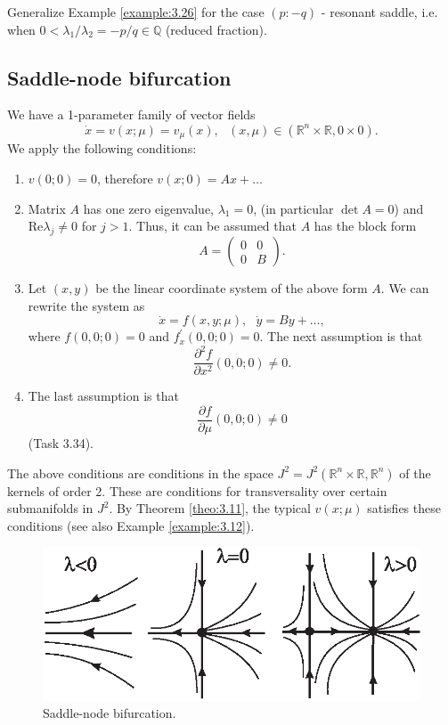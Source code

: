 \begin{task}
	Generalize Example \ref{example:3.26} for the case $\left(p:-q\right)$ - resonant saddle, i.e. when $0<\lambda _{1}/\lambda_{2} = -p/q \in \mathbb{Q}$ (reduced fraction).
\end{task}

\subsection{Saddle-node bifurcation}
We have a 1-parameter family of vector fields
$$
\dot{x}=v(x;\mu )=v_{\mu }(x),\text{ \ \ }\left( x,\mu \right) \in \left(
\mathbb{R}^{n}\times \mathbb{R},0\times 0\right) .
$$
We apply the following conditions:
\begin{enumerate}
	\item $v(0;0)=0$, therefore $v(x;0)=Ax+\ldots $
	\item Matrix $A$ has one zero eigenvalue, $\lambda _{1}=0$, (in particular $\det A = 0$) and $\textrm{Re}\lambda_{j}\not=0$ for $j>1.$ Thus, it can be assumed that $A$ has the block form
	$$
	A=
	\begin{pmatrix}
	0 & 0 \\
	0 & B%
	\end{pmatrix}.
	$$
	\item Let $(x, y)$ be the linear coordinate system of the above form $A$. We can rewrite the system as
	$$
	\dot{x}=f(x,y;\mu ),\text{ \ \ }\dot{y}=By+\ldots ,
	$$
	where $f(0,0;0)=0$ and $f_{x}^{\prime }(0,0;0)=0.$ The next assumption is that
	$$
	\frac{\partial ^{2}f}{\partial x^{2}}(0,0;0)\not=0.
	$$
	\item The last assumption is that
	$$
	\frac{\partial f}{\partial \mu }(0,0;0)\not=0
	$$%
	(Task 3.34).
\end{enumerate}

\begin{remark}
	The above conditions are conditions in the space $J^{2}=J^{2}(\mathbb{R}^{n}\times \mathbb{R},\mathbb{R}^{n})$ of the kernels of order 2. These are conditions for transversality over certain submanifolds in $J^2$. By Theorem \ref{theo:3.11}, the typical $v (x; \mu)$ satisfies these conditions (see also Example \ref{example:3.12}).
\end{remark}

\begin{figure}[!ht]
	\centering
	\includegraphics [scale=1]{jtr311}
	\caption{Saddle-node bifurcation.}
	\label{fig:3.11}
\end{figure}

